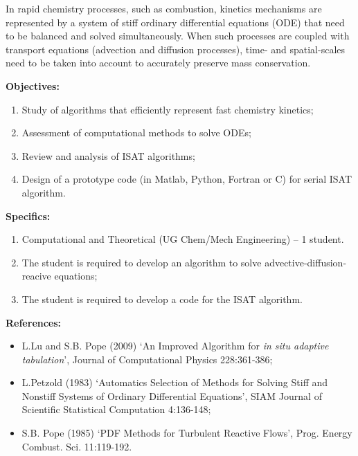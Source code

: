 \documentclass[12pts,a4paper,amsmath,amssymb,floatfix]{article}%
\newcommand{\Chem}{UG Chem/Mech Engineering}
\begin{document}
\begin{enumerate}[label=\bfseries Project: \arabic*:]
In rapid chemistry processes, such as combustion, kinetics mechanisms are represented by a system of stiff ordinary differential equations (ODE) that need to be balanced and solved simultaneously. When such processes are coupled with transport equations (advection and diffusion processes), time- and spatial-scales need to be taken into account to accurately preserve mass conservation. 

\noindent
{\bf Objectives:}
\begin{enumerate}
\item Study of algorithms that efficiently represent fast chemistry kinetics;
\item Assessment of computational methods to solve ODEs;
\item Review and analysis of ISAT algorithms;
\item Design of a prototype code (in Matlab, Python, Fortran or C) for serial ISAT algorithm.
\end{enumerate} 
 
\noindent
{\bf Specifics:} 
\begin{enumerate}
\item Computational and Theoretical (\Chem) -- 1 student.
\item The student is required to develop an algorithm to solve advective-diffusion-reacive equations;
\item The student is required to develop a code for the ISAT algorithm.
\end{enumerate}

\noindent
{\bf References:}
\begin{itemize}
\item L.Lu and S.B. Pope (2009) `An Improved Algorithm for {\it in situ adaptive tabulation}’, Journal of Computational Physics 228:361-386;
\item L.Petzold (1983) `Automatics Selection of Methods for Solving Stiff and Nonstiff Systems of Ordinary Differential Equations', SIAM Journal of Scientific Statistical Computation 4:136-148;
\item S.B. Pope (1985)  `PDF Methods for Turbulent Reactive Flows',  Prog. Energy Combust. Sci. 11:119-192.
\end{itemize}

\clearpage

\end{enumerate}
\end{document}
